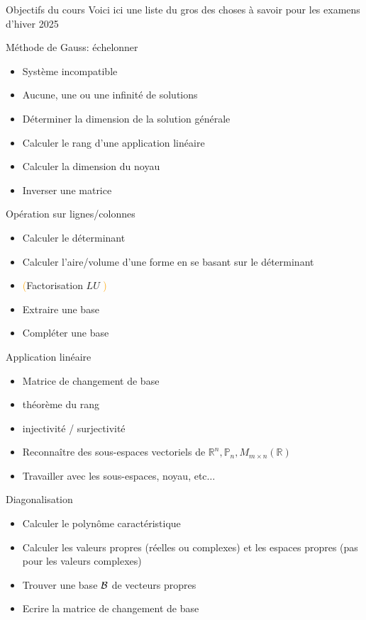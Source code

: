 \begin{parag}{Objectifs du cours}
    Voici ici une liste du gros des choses à savoir pour les examens d'hiver 2025
\end{parag}
\begin{parag}{Méthode de Gauss: échelonner}
    \begin{itemize}
        \item Système incompatible
        \item Aucune, une ou une infinité de solutions
        \item Déterminer la dimension de la solution générale
        \item Calculer le rang d'une application linéaire
        \item Calculer la dimension du noyau
        \item Inverser une matrice
    \end{itemize}
\end{parag}
\begin{parag}{Opération sur lignes/colonnes}
    \begin{itemize}
        \item Calculer le déterminant
        \item Calculer l'aire/volume d'une forme en se basant sur le déterminant
        \item \textcolor{orange}{(}Factorisation $LU$ \textcolor{orange}{)}
        \item Extraire une base
        \item Compléter une base
    \end{itemize}
\end{parag}
\begin{parag}{Application linéaire}
    \begin{itemize}
        \item Matrice de changement de base
        \item  théorème du rang
        \item injectivité / surjectivité
        \item Reconnaître des sous-espaces vectoriels de $\mathbb{R}^n, \mathbb{P}_n, M_{m \times n}(\mathbb{R})$
        \item Travailler avec les sous-espaces, noyau, etc$\dots$
    \end{itemize}
\end{parag}
\begin{parag}{Diagonalisation}
    \begin{itemize}
        \item Calculer le polynôme caractéristique
        \item Calculer les valeurs propres (réelles ou complexes) et les espaces propres (pas pour les valeurs complexes)
        \item Trouver une base $\mathcal{B}$ de vecteurs propres
        \item Ecrire la matrice de changement de base
    \end{itemize}
\end{parag}
